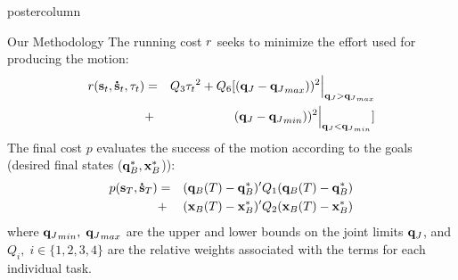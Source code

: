 \documentclass{beamer}
\begin{document}
\begin{frame}
\begin{columns}
\begin{column}{.3\textwidth}
\begin{beamercolorbox}[center]{postercolumn}
\begin{minipage}{.98\textwidth}
{\begin{myblock}{Our Methodology}
The running cost $ r $ seeks 
to minimize the effort used for producing the motion:
\begin{eqnarray}
 \label{eq:final_cost1}
  r( \mathbf{s}_t, \mathbf{\dot{s}}_t, \mathbf{\tau}_t)  & = & Q_{3}  {\mathbf{\tau}_t}^{2} 
    + Q_{6} [(\mathbf{q}_{J} - {\mathbf{q}_{J}}_{max}))^2 \Big|_{\mathbf{q}_{J}  > {\mathbf{q}_{J}}_{max}} \\ \nonumber
    & + & (\mathbf{q}_{J} - {\mathbf{q}_{J}}_{min}))^2 \Big|_{\mathbf{q}_{J}  < {\mathbf{q}_{J}}_{min}}] 
\end{eqnarray}
The final cost $p$ evaluates the success of the motion according to the goals 
(desired final states ($\mathbf{q}^{*}_{B}, \mathbf{x}^{*}_{B}$)):
\begin{eqnarray}
 \label{eq:final_cost}
  p (\mathbf{s}_T, \mathbf{\dot{s}}_T) & = & (\mathbf{q}_{B}(T) - \mathbf{q}^{*}_{B})' Q_{1} (\mathbf{q}_{B}(T) - \mathbf{q}^{*}_{B}) \\ \nonumber
  & + & (\mathbf{x}_{B}(T) - \mathbf{x}^{*}_{B})' Q_{2} (\mathbf{x}_{B}(T) - \mathbf{x}^{*}_{B})
\end{eqnarray}
\noindent
where ${\mathbf{q}_{J}}_{min},\; {\mathbf{q}_{J}}_{max}$ are the upper and lower bounds on the joint limits $\mathbf{q}_{J}$,
and $Q_{i}, \; i \in \{1,2,3,4\}$ are the relative weights associated with the terms for each individual task.
% 
% 

\end{myblock}}
\end{minipage}
\end{beamercolorbox}
\end{column}
\end{columns}
\end{frame}
\end{document}
